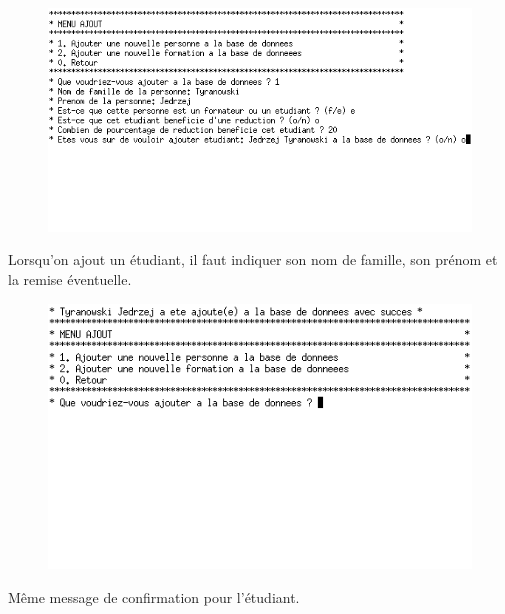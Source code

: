 \documentclass[11pt]{article}
\begin{document}
\begin{figure}[ht]
  \centering
  \includegraphics[trim=0 110 0 0, clip, scale=0.7]{images/09.png.png}
\end{figure}
Lorsqu'on ajout un étudiant, il faut indiquer son nom de famille, son prénom et la remise éventuelle.

\begin{figure}[ht]
  \centering
  \includegraphics[trim=0 180 0 0, clip, scale=0.8]{images/10.png.png}
\end{figure}
Même message de confirmation pour l'étudiant.

\newpage
\end{document}
